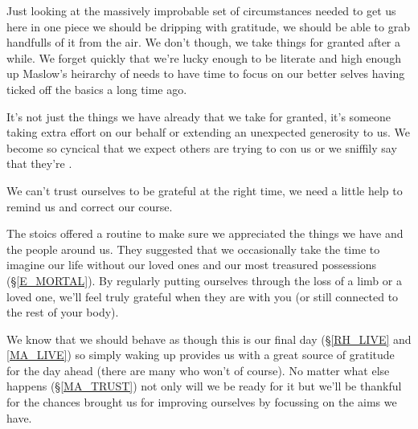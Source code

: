 \cleartorightpage
{\small

Just looking at the massively improbable set of circumstances needed to get us here in one piece we should be dripping with gratitude, we should be able to grab handfulls of it from the air. We don't though, we take things for granted after a while. We forget quickly that we're lucky enough to be literate and high enough up Maslow's heirarchy of needs to have time to focus on our better selves having ticked off the basics a long time ago. 

It's not just the things we have already that we take for granted, it's someone taking extra effort on our behalf or extending an unexpected generosity to us. We become so cyncical that we expect others are trying to con us or we sniffily say that they're .

We can't trust ourselves to be  grateful at the right time, we need a little help to remind us and correct our course.

The stoics offered a routine to make sure we appreciated the things we have and the people around us. They suggested that we occasionally take the time to imagine our life without our loved ones and our most treasured possessions (\S \ref{E_MORTAL}). By regularly putting ourselves through the loss of a limb or a loved one, we'll feel truly grateful when they are with you (or still connected to the rest of your body).

We know that we should behave as though this is our final day (\S \ref{RH_LIVE} and \ref{MA_LIVE}) so simply waking up provides us with a great source of gratitude for the day ahead (there are many who won't of course). No matter what else happens (\S \ref{MA_TRUST}) not only will we be ready for it but we'll be thankful for the chances brought us for improving ourselves by focussing on the aims we have.

}
